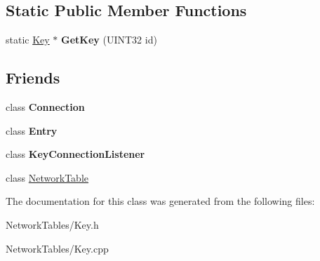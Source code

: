 \subsection*{Static Public Member Functions}
\begin{DoxyCompactItemize}
\item 
\hypertarget{classNetworkTables_1_1Key_a56f47296c3bce75f0c132b69aecb3142}{
static \hyperlink{classNetworkTables_1_1Key}{Key} $\ast$ {\bfseries GetKey} (UINT32 id)}
\label{classNetworkTables_1_1Key_a56f47296c3bce75f0c132b69aecb3142}

\end{DoxyCompactItemize}
\subsection*{Friends}
\begin{DoxyCompactItemize}
\item 
\hypertarget{classNetworkTables_1_1Key_a54a11fdc71e1679a42fa0c0e3856673d}{
class {\bfseries Connection}}
\label{classNetworkTables_1_1Key_a54a11fdc71e1679a42fa0c0e3856673d}

\item 
\hypertarget{classNetworkTables_1_1Key_a9c1c9015f481a5d1e2eebb42a451d784}{
class {\bfseries Entry}}
\label{classNetworkTables_1_1Key_a9c1c9015f481a5d1e2eebb42a451d784}

\item 
\hypertarget{classNetworkTables_1_1Key_a787a8fe34385b427c7cfcced0ebbc1a8}{
class {\bfseries KeyConnectionListener}}
\label{classNetworkTables_1_1Key_a787a8fe34385b427c7cfcced0ebbc1a8}

\item 
\hypertarget{classNetworkTables_1_1Key_a3905c4951f43c6e488137ab3b23d9783}{
class \hyperlink{classNetworkTables_1_1Key_a3905c4951f43c6e488137ab3b23d9783}{NetworkTable}}
\label{classNetworkTables_1_1Key_a3905c4951f43c6e488137ab3b23d9783}

\end{DoxyCompactItemize}


The documentation for this class was generated from the following files:\begin{DoxyCompactItemize}
\item 
NetworkTables/Key.h\item 
NetworkTables/Key.cpp\end{DoxyCompactItemize}
